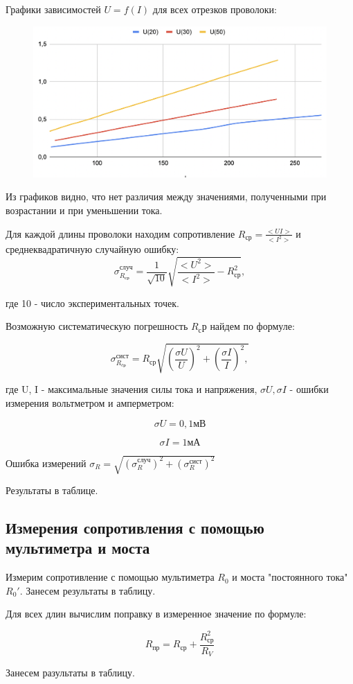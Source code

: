 \documentclass[a4paper,12pt]{article} %
\begin{document}
 Графики зависимостей $U=f(I)$ для всех отрезков проволоки:
\begin{figure}[h]
\centering
\includegraphics[width=0.6\linewidth]{Гр1}
\label{fig:mpr}
\end{figure}

Из графиков видно, что нет различия между значениями, полученными при возрастании и при уменьшении тока.

Для каждой длины проволоки находим сопротивление $R_{ср}=\frac{<UI>}{<I^2>}$ и среднеквадратичную случайную ошибку:
\[\sigma^{случ}_{R_{ср}} = \frac{1}{\sqrt{10}}\sqrt{\frac{<U^2>}{<I^2>}-R^2_{ср}},\]

где 10 - число экспериментальных точек.

Возможную систематическую погрешность $R_ср$ найдем по формуле:

\[\sigma^{сист}_{R_{cр}} = R_{ср}\sqrt{(\frac{\sigma U}{U})^2+(\frac{\sigma I}{I})^2,}\]

где U, I - максимальные значения силы тока и напряжения, $\sigma U, \sigma I$ - ошибки измерения вольтметром и амперметром:

\[\sigma U = 0,1 мВ\]

\[\sigma I = 1 мА\]

 Ошибка измерений $\sigma_R = \sqrt{(\sigma^{случ}_R)^2 +  (\sigma^{сист}_R)^2}$

Результаты в таблице.

\subsection{Измерения сопротивления с помощью мультиметра и моста}

Измерим сопротивление с помощью мультиметра $R_0$ и моста "постоянного тока"  $ R_0'$. Занесем результаты в таблицу.

Для всех длин вычислим поправку в измеренное значение по формуле: 

\[ R_{пр} = R_{ср} + \frac{R_{ср}^2}{R_V} \]


Занесем разультаты в таблицу.

\medskip
\end{document}
